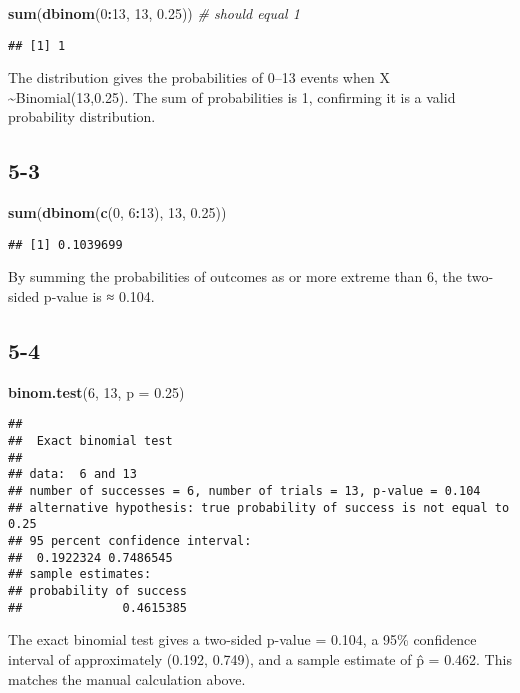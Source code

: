 \documentclass[
]{article}
\newenvironment{Shaded}{\begin{snugshade}}{\end{snugshade}}
\newcommand{\AttributeTok}[1]{\textcolor[rgb]{0.13,0.29,0.53}{#1}}
\newcommand{\CommentTok}[1]{\textcolor[rgb]{0.56,0.35,0.01}{\textit{#1}}}
\newcommand{\DecValTok}[1]{\textcolor[rgb]{0.00,0.00,0.81}{#1}}
\newcommand{\FloatTok}[1]{\textcolor[rgb]{0.00,0.00,0.81}{#1}}
\newcommand{\FunctionTok}[1]{\textcolor[rgb]{0.13,0.29,0.53}{\textbf{#1}}}
\newcommand{\NormalTok}[1]{#1}
\newcommand{\SpecialCharTok}[1]{\textcolor[rgb]{0.81,0.36,0.00}{\textbf{#1}}}
\begin{document}
\begin{Shaded}
\begin{Highlighting}[]
\FunctionTok{sum}\NormalTok{(}\FunctionTok{dbinom}\NormalTok{(}\DecValTok{0}\SpecialCharTok{:}\DecValTok{13}\NormalTok{, }\DecValTok{13}\NormalTok{, }\FloatTok{0.25}\NormalTok{))      }\CommentTok{\# should equal 1}
\end{Highlighting}
\end{Shaded}

\begin{verbatim}
## [1] 1
\end{verbatim}

The distribution gives the probabilities of 0--13 events when X
\sim Binomial(13,0.25). The sum of probabilities is 1, confirming it is
a valid probability distribution.

\subsection{5-3}\label{section-10}

\begin{Shaded}
\begin{Highlighting}[]
\FunctionTok{sum}\NormalTok{(}\FunctionTok{dbinom}\NormalTok{(}\FunctionTok{c}\NormalTok{(}\DecValTok{0}\NormalTok{, }\DecValTok{6}\SpecialCharTok{:}\DecValTok{13}\NormalTok{), }\DecValTok{13}\NormalTok{, }\FloatTok{0.25}\NormalTok{))}
\end{Highlighting}
\end{Shaded}

\begin{verbatim}
## [1] 0.1039699
\end{verbatim}

By summing the probabilities of outcomes as or more extreme than 6, the
two-sided p-value is ≈ 0.104.

\subsection{5-4}\label{section-11}

\begin{Shaded}
\begin{Highlighting}[]
\FunctionTok{binom.test}\NormalTok{(}\DecValTok{6}\NormalTok{, }\DecValTok{13}\NormalTok{, }\AttributeTok{p =} \FloatTok{0.25}\NormalTok{)}
\end{Highlighting}
\end{Shaded}

\begin{verbatim}
## 
##  Exact binomial test
## 
## data:  6 and 13
## number of successes = 6, number of trials = 13, p-value = 0.104
## alternative hypothesis: true probability of success is not equal to 0.25
## 95 percent confidence interval:
##  0.1922324 0.7486545
## sample estimates:
## probability of success 
##              0.4615385
\end{verbatim}

The exact binomial test gives a two-sided p-value = 0.104, a 95\%
confidence interval of approximately (0.192, 0.749), and a sample
estimate of p̂ = 0.462. This matches the manual calculation above.
\end{document}
